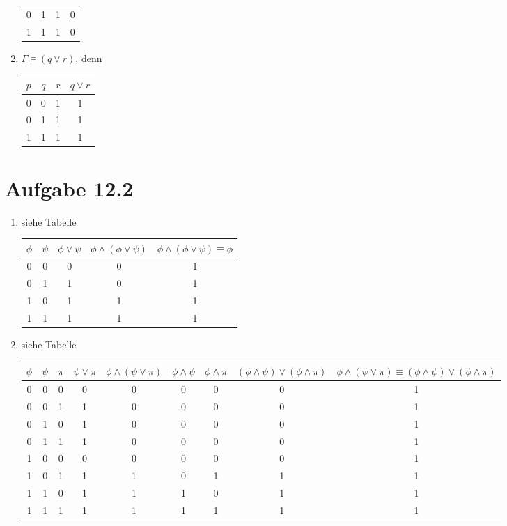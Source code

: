 \documentclass{article}
\begin{document}
\begin{enumerate}[label=(\alph*)]
\begin{center}
\begin{tabular}{ccc||c}
				0 & 1 & 1 & 0 \\
				1 & 1 & 1 & 0 \\
			\end{tabular}
		\end{center}
		\item $\Gamma\models (q\lor r)$, denn
		\begin{center}
			\begin{tabular}{ccc||c}
				$p$ & $q$ & $r$ & $q\lor r$ \\
				\hline
				0 & 0 & 1 & 1 \\
				0 & 1 & 1 & 1 \\
				1 & 1 & 1 & 1 \\
			\end{tabular}
		\end{center}
	\end{enumerate}
	
	\section*{Aufgabe 12.2}
	\begin{enumerate}[label=(\alph*)]
		\item siehe Tabelle
		\begin{center}
			\begin{tabular}{cc||c|c|c}
				$\phi$ & $\psi$ & $\phi\lor\psi$ & $\phi\land(\phi\lor\psi)$ & $\phi\land(\phi\lor\psi)\equiv\phi$ \\
				\hline
				0 & 0 & 0 & 0 & 1 \\
				0 & 1 & 1 & 0 & 1 \\
				1 & 0 & 1 & 1 & 1 \\
				1 & 1 & 1 & 1 & 1 \\
			\end{tabular}
		\end{center}
		\item siehe Tabelle
		\begin{center}
			\begin{tabular}{ccc||c|c|c|c|c|c}
				$\phi$ & $\psi$ & $\pi$ & $\psi\lor\pi$ & $\phi\land(\psi\lor\pi)$ & $\phi\land\psi$ & $\phi\land\pi$ & $(\phi\land\psi)\lor(\phi\land\pi)$ & $\phi\land(\psi\lor\pi)\equiv(\phi\land\psi)\lor(\phi\land\pi)$ \\
				\hline
				0 & 0 & 0 & 0 & 0 & 0 & 0 & 0 & 1 \\
				0 & 0 & 1 & 1 & 0 & 0 & 0 & 0 & 1 \\
				0 & 1 & 0 & 1 & 0 & 0 & 0 & 0 & 1 \\
				0 & 1 & 1 & 1 & 0 & 0 & 0 & 0 & 1 \\
				1 & 0 & 0 & 0 & 0 & 0 & 0 & 0 & 1 \\
				1 & 0 & 1 & 1 & 1 & 0 & 1 & 1 & 1 \\
				1 & 1 & 0 & 1 & 1 & 1 & 0 & 1 & 1 \\
				1 & 1 & 1 & 1 & 1 & 1 & 1 & 1 & 1
			\end{tabular}
		\end{center}
	\end{enumerate}
\end{document}
